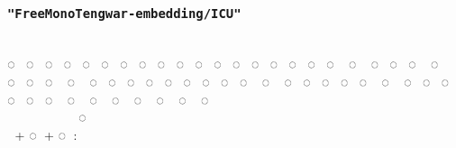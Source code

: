 \documentclass{article}
\begin{document}
\subsubsection*{\texttt{"FreeMonoTengwar-embedding/ICU"}}

\embedICU
                          \\
◌ ◌ ◌ ◌ ◌ ◌ ◌ ◌ ◌ ◌ ◌ ◌ ◌ ◌ ◌ ◌ ◌ ◌ ◌ ◌ ◌ ◌ ◌ ◌ ◌ ◌ ◌ ◌ ◌ ◌ ◌ ◌ ◌ ◌ ◌ ◌ ◌ ◌ ◌ ◌ ◌ ◌ ◌ ◌ ◌ ◌ ◌ ◌ ◌ ◌ ◌ ◌ ◌ ◌ ◌ ◌\\
      ◌‍ ‍ ‍ ‍ \\
 \normalfont + \embedICU ◌ \normalfont + \embedICU ◌ : 
\end{document}
